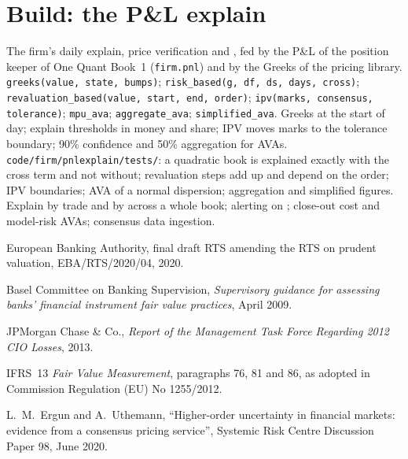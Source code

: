 \section{Build: the P\&L explain}\label{bld:rc:pnl-explain-and-independent-price-verification:pnlexplain}

\begin{build}
 The firm's daily explain, price verification and , fed by the P\&L of the
position keeper of One Quant Book~1 (\texttt{firm.pnl}) and by the Greeks of the pricing library.
 \texttt{greeks(value, state, bumps)}; \texttt{risk\_based(g, df, ds, days, cross)};
\texttt{revaluation\_based(value, start, end, order)}; \texttt{ipv(marks, consensus, tolerance)};
\texttt{mpu\_ava}; \texttt{aggregate\_ava}; \texttt{simplified\_ava}.
 Greeks at the start of day; explain thresholds in money and share; IPV moves marks to the
tolerance boundary; 90\% confidence and 50\% aggregation for AVAs.
 \texttt{code/firm/pnlexplain/tests/}: a quadratic book is explained exactly with the
cross term and not without; revaluation steps add up and depend on the order; IPV boundaries; AVA of a normal
dispersion; aggregation and simplified figures.
 Explain by trade and by  across a whole book; alerting on ; close-out
cost and model-risk AVAs; consensus data ingestion.
\end{build}

\begin{omsources}
\item European Banking Authority, final draft RTS amending the RTS on prudent valuation, EBA/RTS/2020/04, 2020.
\item Basel Committee on Banking Supervision, \emph{Supervisory guidance for assessing banks' financial
instrument fair value practices}, April 2009.
\item JPMorgan Chase \& Co., \emph{Report of the Management Task Force Regarding 2012 CIO Losses}, 2013.
\item IFRS~13 \emph{Fair Value Measurement}, paragraphs 76, 81 and 86, as adopted in Commission Regulation (EU)
No 1255/2012.
\item L.~M.\ Ergun and A.~Uthemann, ``Higher-order uncertainty in financial markets: evidence from a
consensus pricing service'', Systemic Risk Centre Discussion Paper 98, June 2020.
\end{omsources}

